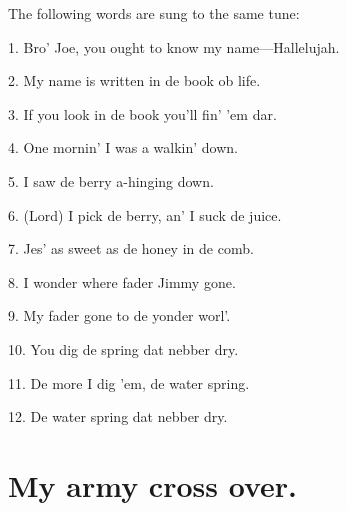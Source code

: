 \documentclass[a5paper,10pt]{book}
\begin{document}
\newpage
\thispagestyle{empty}

\begin{songpart}
\end{songpart}
\begin{song}
\end{song}

\bigskip

The following words are sung to the same tune:

\begin{stanza}
\setlength{\itemsep}{1pt}
\setlength{\parskip}{0pt}
\item[1.]
  Bro' Joe, you ought to know my name---Hallelujah.
\item[2.]
  My name is written in de book ob life.
\item[3.]
  If you look in de book you'll fin' 'em dar.
\item[4.]
  One mornin' I was a walkin' down.
\item[5.]
  I saw de berry a-hinging down.
\item[6.]
  (Lord) I pick de berry, an' I suck de juice.
\item[7.]
  Jes' as sweet as de honey in de comb.
\item[8.]
  I wonder where fader Jimmy gone.
\item[9.]
  My fader gone to de yonder worl'.
\item[10.]
  You dig de spring dat nebber dry.
\item[11.]
  De more I dig 'em, de water spring.
\item[12.]
  De water spring dat nebber dry.
\end{stanza}

\begin{extra}
\end{extra}

\newpage
\section{My army cross over.}
\thispagestyle{empty}
\end{document}
